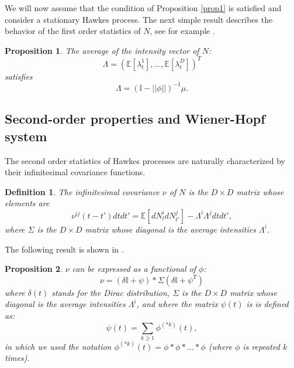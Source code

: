 \documentclass[a4paper,11pt]{article}
\newtheorem{definition}{Definition}[section]
\newtheorem{proposition}{Proposition}[section]
\newcommand{\E}{\mathbb{E}}
\begin{document}
\noindent We will now assume that the condition of Proposition \ref{prop1} is satisfied and consider a stationary Hawkes process.
The next simple result describes the behavior of the first order statistics of $N$, see for example \cite{bacry2014second}.

\begin{proposition}
\label{order1}
The average of the intensity vector of $N$: $$\Lambda=(\E[\lambda^1_t],...,\E[\lambda^D_t])^T$$ satisfies
\begin{equation}
\label{mu}
\Lambda=(\mathbb{I}-||\phi||)^{-1}\mu.
\end{equation}
\end{proposition}

\subsection{Second-order properties and Wiener-Hopf system}
\label{sec:secondorder}
The second order statistics of Hawkes processes are naturally characterized by their infinitesimal covariance functions.
\begin{definition}
The infinitesimal covariance $\nu$ of $N$ is the $D \times D$ matrix whose elements are
$$\nu^{ij}(t-t')dtdt'=\E[dN^i_tdN^j_{t'}]-\Lambda^i\Lambda^jdtdt',$$
where $\Sigma$ is the $D \times D$ matrix whose diagonal is the average intensities $\Lambda^i$.
\end{definition}
\noindent The following result is shown in \cite{bacry2012non}.
\begin{proposition}
$\nu$ can be expressed as a functional of $\phi$:
\begin{equation}
\label{nuphi}
\nu = (\delta \mathbb{I} + \psi) \ast \Sigma (\delta \mathbb{I} + \psi^T)
\end{equation}
where $\delta(t)$ stands for the Dirac distribution, $\Sigma$ is the $D \times D$ matrix whose diagonal is the average intensities $\Lambda^i$,
and
where the matrix $\psi(t)$ is
is defined as:
\begin{equation}
\label{defpsi}
\psi(t) = \sum_{k\geq 1} \phi^{(*k)}(t),
\end{equation}
in which we used the notation $\phi^{(*k)}(t) = \phi \ast \phi \ast \ldots \ast \phi$ (where $\phi$ is repeated $k$ times).
\end{proposition}
\end{document}
